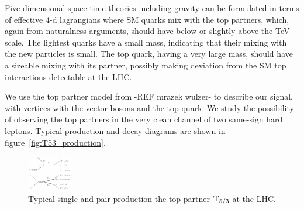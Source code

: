 Five-dimensional space-time theories including gravity can be formulated in
terms of effective 4-d lagrangians where SM quarks mix with the top
partners, which, again from naturalness arguments, should have below or
slightly above the \unit[]{TeV} scale.
The lightest quarks have a small mass, indicating that their mixing with the
new particles is small. The top quark, having a very large mass, should have
a sizeable mixing with its partner, possibly making deviation
from the SM top interactions detectable at the LHC.

We use the top partner model from -REF mrazek wulzer- to describe our
signal, with vertices with the vector bosons and the top quark. 
We study the possibility of observing the top partners in the very clean
channel of two same-sign hard leptons. Typical production and decay diagrams
are shown in figure~\ref{fig:T53_production}.

\begin{figure}[htb]
    \centering
    \includegraphics[width=\textwidth]{images/pdf/T53_production}
    \caption{Typical single and pair production the top partner $\mathrm{T}_{5/3}$ at the
    LHC.}
    \label{fig:higgs_correction}
\end{figure}
